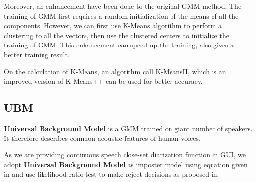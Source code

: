 Moreover, an enhancement have been done to the original GMM method.
The training of GMM first requires a random initialization of the means of
all the components. However, we can first use K-Means algorithm\cite{kmeans} to perform a clustering
to all the vectors, then use the clustered centers to initialize the training of GMM.
This enhancement can speed up the training, also gives a better training result.

On the calculation of K-Means, an algorithm call K-MeansII\cite{bahmani2012scalable},
which is an improved version of K-Means++\cite{arthur2007k} can be used for better accuracy.


\subsection{UBM}

\textbf{Universal Background Model} is a GMM trained on giant number of speakers.
It therefore describes common acoustic features of human voices.\cite{UBM}

As we are providing continuous speech close-set diarization function in
GUI, we adopt \textbf{Universal Background Model} as imposter model using equation
given in \cite{reynolds2000speaker}
and use likelihood ratio test to make reject decisions as proposed in\cite{reynolds2000speaker}.

